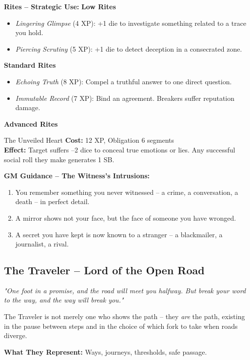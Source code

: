 \documentclass[10pt,a5paper]{book}
\begin{document}
\textbf{Rites -- Strategic Use:}
\textbf{Low Rites}
\begin{itemize}
    \item \textit{Lingering Glimpse} (4 XP): +1 die to investigate something related to a trace you hold.
    \item \textit{Piercing Scrutiny} (5 XP): +1 die to detect deception in a consecrated zone.
\end{itemize}
\textbf{Standard Rites}
\begin{itemize}
    \item \textit{Echoing Truth} (8 XP): Compel a truthful answer to one direct question.
    \item \textit{Immutable Record} (7 XP): Bind an agreement. Breakers suffer reputation damage.
\end{itemize}
\textbf{Advanced Rites}
\begin{patronbox}{The Unveiled Heart}
\textbf{Cost:} 12 XP, Obligation 6 segments \\
\textbf{Effect:} Target suffers --2 dice to conceal true emotions or lies. Any successful social roll they make generates 1 SB.
\end{patronbox}

\textbf{GM Guidance -- The Witness's Intrusions:}
\begin{enumerate}
    \item You remember something you never witnessed -- a crime, a conversation, a death -- in perfect detail.
    \item A mirror shows not your face, but the face of someone you have wronged.
    \item A secret you have kept is now known to a stranger -- a blackmailer, a journalist, a rival.
\end{enumerate}

\clearpage

\subsection{The Traveler -- Lord of the Open Road}
\label{patron:traveler}

\textit{"One foot in a promise, and the road will meet you halfway. But break your word to the way, and the way will break you."}

The Traveler is not merely one who shows the path -- they \textit{are} the path, existing in the pause between steps and in the choice of which fork to take when roads diverge.

\textbf{What They Represent:} Ways, journeys, thresholds, safe passage.
\end{document}
